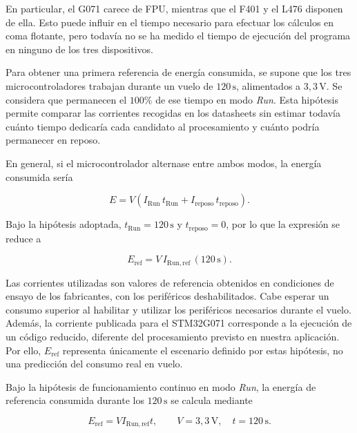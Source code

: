 \documentclass[11pt,a4paper]{article}
\begin{document}
En particular, el G071 carece de FPU, mientras que el F401 y
el L476 disponen de ella. Esto puede influir en el tiempo
necesario para efectuar los cálculos en coma flotante, pero
todavía no se ha medido el tiempo de ejecución del programa
en ninguno de los tres dispositivos.


Para obtener una primera referencia de energía consumida, se supone
que los tres microcontroladores trabajan durante un vuelo de
\(120\,\mathrm{s}\), alimentados a \(3{,}3\,\mathrm{V}\). Se considera que
permanecen el \(100\%\) de ese tiempo en modo \textit{Run}. Esta
hipótesis permite comparar las corrientes recogidas en los datasheets
sin estimar todavía cuánto tiempo dedicaría cada candidato al
procesamiento y cuánto podría permanecer en reposo.

En general, si el microcontrolador alternase entre ambos modos, la
energía consumida sería

\begin{equation}
E = V\left(
I_{\mathrm{Run}}\,t_{\mathrm{Run}}
+
I_{\mathrm{reposo}}\,t_{\mathrm{reposo}}
\right).
\end{equation}

Bajo la hipótesis adoptada,
\(t_{\mathrm{Run}}=120\,\mathrm{s}\) y
\(t_{\mathrm{reposo}}=0\), por lo que la expresión se reduce a

\begin{equation}
E_{\mathrm{ref}} =
V\,I_{\mathrm{Run,ref}}\,(120\,\mathrm{s}).
\end{equation}

Las corrientes utilizadas son valores de referencia obtenidos en
condiciones de ensayo de los fabricantes, con los periféricos
deshabilitados. Cabe esperar un consumo superior al habilitar y
utilizar los periféricos necesarios durante el vuelo. Además, la
corriente publicada para el STM32G071 corresponde a la ejecución de
un código reducido, diferente del procesamiento previsto en nuestra
aplicación. Por ello, \(E_{\mathrm{ref}}\) representa únicamente
el escenario definido por estas hipótesis, no una predicción del
consumo real en vuelo.

Bajo la hipótesis de funcionamiento continuo en modo \textit{Run},
la energía de referencia consumida durante los \(120\,\mathrm{s}\)
se calcula mediante

\begin{equation}
E_{\mathrm{ref}}
= V I_{\mathrm{Run,ref}}t,
\qquad
V=3{,}3\,\mathrm{V},
\quad t=120\,\mathrm{s}.
\end{equation}
\end{document}
